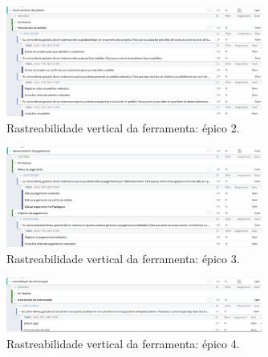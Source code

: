 \begin{figure}[!htbp]
\centering
\includegraphics[width=0.75\textwidth]{figuras/targetprocess_ep2}
\caption{Rastreabilidade vertical da ferramenta: épico 2.}
\label{targetprocess_ep2}
\end{figure}

\begin{figure}[!htbp]
\centering
\includegraphics[width=0.75\textwidth]{figuras/targetprocess_ep3}
\caption{Rastreabilidade vertical da ferramenta: épico 3.}
\label{targetprocess_ep3}
\end{figure}

\begin{figure}[!htbp]
\centering
\includegraphics[width=0.75\textwidth]{figuras/targetprocess_ep4}
\caption{Rastreabilidade vertical da ferramenta: épico 4.}
\label{targetprocess_ep4}
\end{figure}

